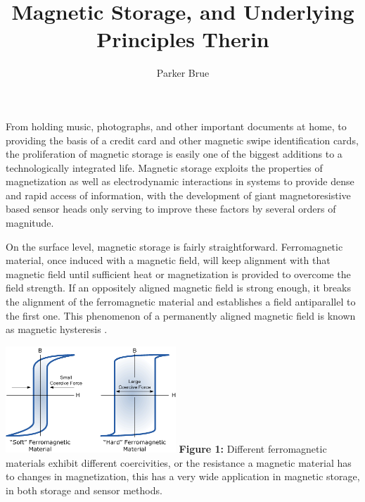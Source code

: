 \documentclass[11pt]{article}
\title{Magnetic Storage, and Underlying Principles Therin}
\author{Parker Brue}
\begin{document}
\maketitle
\thispagestyle{fancy}

\begin{multicols}{2} %
From holding music, photographs, and other important documents at home, to providing the basis of a credit card and other magnetic swipe identification cards, the proliferation of magnetic storage is easily one of the biggest additions to a technologically integrated life. Magnetic storage exploits the properties of magnetization as well as electrodynamic interactions in systems to provide dense and rapid access of information, with the development of giant magnetoresistive based sensor heads only serving to improve these factors by several orders of magnitude.



On the surface level, magnetic storage is fairly straightforward. Ferromagnetic material, once induced with a magnetic field, will keep alignment with that magnetic field until sufficient heat or magnetization is provided to overcome the field strength. If an oppositely aligned magnetic field is strong enough, it breaks the alignment of the ferromagnetic material and establishes a field antiparallel to the first one. This phenomenon of a permanently aligned magnetic field is known as magnetic hysteresis \cite{label1}.

\begin{center}
	\centering
	\includegraphics[width=0.48\textwidth]{mag_hysterisis.png}
	{\footnotesize\textbf{Figure 1:} Different ferromagnetic materials exhibit different coercivities, or the resistance a magnetic material has to changes in magnetization, this has a very wide application in magnetic storage, in both storage and sensor methods. \cite{label7}} 
\end{center} 


\end{multicols}
\end{document}

